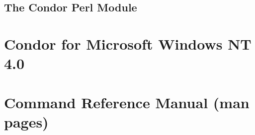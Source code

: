 \documentclass[titlepage,oneside]{book}
\begin{document}
\section{\label{condor-pm}
The Condor Perl Module}


\chapter{Condor for Microsoft Windows NT 4.0}
\label{condor-nt}


\chapter{Command Reference Manual (man pages)}
\label{command-reference}


%
%
  \fancyhead[LE,RO]{\thepage}
  \fancyhead[RE]{\leftmark}
  \fancyhead[LO]{\rightmark}

\backmatter
{}
\label{index}
\printindex
\end{document}
